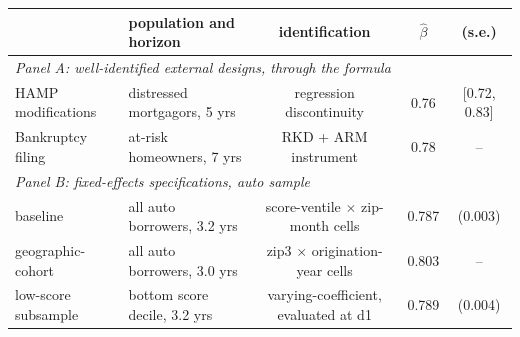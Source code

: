 \begin{tabular}{llccc}
\toprule
 & population and horizon & identification & $\widehat\beta$ & (s.e.) \\
\midrule
\multicolumn{5}{l}{\emph{Panel A: well-identified external designs, through the formula}} \\
HAMP modifications & distressed mortgagors, 5 yrs & regression discontinuity & 0.76 & [0.72, 0.83] \\
Bankruptcy filing & at-risk homeowners, 7 yrs & RKD + ARM instrument & 0.78 & -- \\
\midrule
\multicolumn{5}{l}{\emph{Panel B: fixed-effects specifications, auto sample}} \\
baseline & all auto borrowers, 3.2 yrs & score-ventile $\times$ zip-month cells & 0.787 & (0.003) \\
geographic-cohort & all auto borrowers, 3.0 yrs & zip3 $\times$ origination-year cells & 0.803 & -- \\
low-score subsample & bottom score decile, 3.2 yrs & varying-coefficient, evaluated at d1 & 0.789 & (0.004) \\
\bottomrule
\end{tabular}